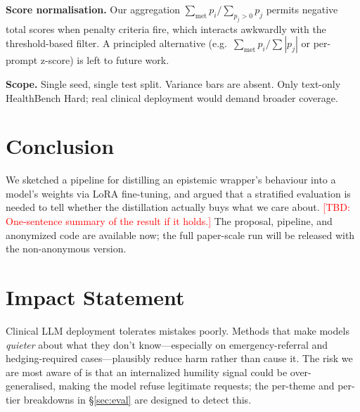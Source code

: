 \documentclass[10pt,letterpaper]{article}
\newcommand{\tbd}[1]{\textcolor{red}{[TBD: #1]}}
\begin{document}
\textbf{Score normalisation.} Our aggregation
$\sum_\text{met} p_i / \sum_{p_j > 0} p_j$ permits negative total
scores when penalty criteria fire, which interacts awkwardly with the
threshold-based filter. A principled alternative
(e.g.\ $\sum_\text{met} p_i / \sum |p_j|$ or per-prompt z-score) is
left to future work.

\textbf{Scope.} Single seed, single test split. Variance bars are
absent. Only text-only HealthBench Hard; real clinical deployment
would demand broader coverage.

\section{Conclusion}

We sketched a pipeline for distilling an epistemic wrapper's behaviour
into a model's weights via LoRA fine-tuning, and argued that a stratified
evaluation is needed to tell whether the distillation actually buys
what we care about. \tbd{One-sentence summary of the result if it
holds.} The proposal, pipeline, and anonymized code are available now;
the full paper-scale run will be released with the non-anonymous
version.

\section*{Impact Statement}
Clinical LLM deployment tolerates mistakes poorly. Methods that make
models \emph{quieter} about what they don't know---especially on
emergency-referral and hedging-required cases---plausibly reduce harm
rather than cause it. The risk we are most aware of is that an
internalized humility signal could be over-generalised, making the
model refuse legitimate requests; the per-theme and per-tier breakdowns
in \S\ref{sec:eval} are designed to detect this.
\end{document}
